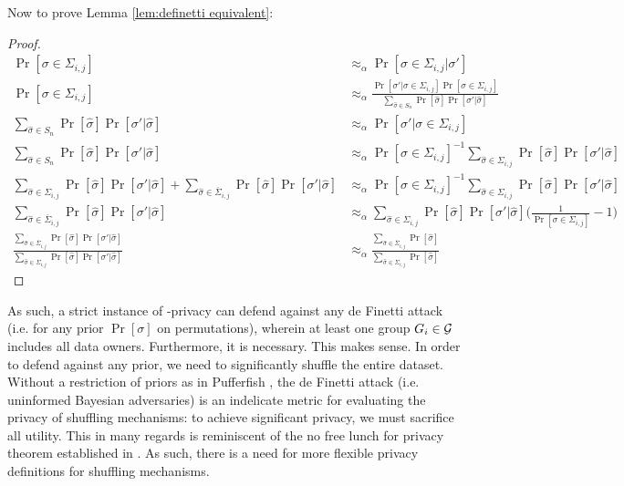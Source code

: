 Now to prove Lemma \ref{lem:definetti equivalent}: 
\begin{proof}
\begin{align*}
    \Pr[\sigma \in \Sigma_{i,j} ] 
    &\approx_\alpha \Pr[\sigma \in \Sigma_{i,j} | \sigma'] \\
    \Pr[\sigma \in \Sigma_{i,j} ]
    &\approx_\alpha \frac{\Pr[\sigma' | \sigma \in \Sigma_{i,j}] \Pr[\sigma \in \Sigma_{i,j} ]}{\sum_{\hat{\sigma} \in S_n} \Pr[\hat{\sigma}] \Pr[\sigma' | \hat{\sigma}]} \\
    \sum_{\hat{\sigma} \in S_n} \Pr[\hat{\sigma}] \Pr[\sigma' | \hat{\sigma}] 
    &\approx_\alpha \Pr[\sigma' | \sigma \in \Sigma_{i,j}] \\
    \sum_{\hat{\sigma} \in S_n} \Pr[\hat{\sigma}] \Pr[\sigma' | \hat{\sigma}] 
    &\approx_\alpha \Pr[\sigma \in \Sigma_{i,j}]^{-1} \sum_{\hat{\sigma} \in \Sigma_{i,j}} \Pr[\hat{\sigma}] \Pr[\sigma' | \hat{\sigma}] \\
    \sum_{\hat{\sigma} \in \Sigma_{i,j}} \Pr[\hat{\sigma}] \Pr[\sigma' | \hat{\sigma}] +
    \sum_{\hat{\sigma} \in \overline{\Sigma}_{i,j}} \Pr[\hat{\sigma}] \Pr[\sigma' | \hat{\sigma}] 
    &\approx_\alpha \Pr[\sigma \in \Sigma_{i,j}]^{-1} \sum_{\hat{\sigma} \in \Sigma_{i,j}} \Pr[\hat{\sigma}] \Pr[\sigma' | \hat{\sigma}] \\
    \sum_{\hat{\sigma} \in \overline{\Sigma}_{i,j}} \Pr[\hat{\sigma}] \Pr[\sigma' | \hat{\sigma}] 
    &\approx_\alpha \sum_{\hat{\sigma} \in \Sigma_{i,j}} \Pr[\hat{\sigma}] \Pr[\sigma' | \hat{\sigma}] 
    \Big( \frac{1}{\Pr[\sigma \in \Sigma_{i,j}]} - 1 \Big)  \\
    \frac{\sum_{\hat{\sigma} \in \overline{\Sigma}_{i,j}} \Pr[\hat{\sigma}] \Pr[\sigma' | \hat{\sigma}] }{
    \sum_{\hat{\sigma} \in {\Sigma_{i,j}}} \Pr[\hat{\sigma}] \Pr[\sigma' | \hat{\sigma}] } 
    &\approx_\alpha 
    \frac{\sum_{\hat{\sigma} \in \overline{\Sigma}_{i,j}} \Pr[\hat{\sigma}] }{
    \sum_{\hat{\sigma} \in {\Sigma_{i,j}}} \Pr[\hat{\sigma}] }
\end{align*}
\end{proof}

As such, a strict instance of \name-privacy can defend against any de Finetti attack (i.e. for any prior $\Pr[\sigma]$ on permutations), wherein at least one group $G_i \in \mathcal{G}$ includes all data owners. Furthermore, it is necessary. This makes sense. In order to defend against any prior, we need to significantly shuffle the entire dataset. Without a restriction of priors as in Pufferfish \cite{Pufferfish}, the de Finetti attack (i.e. uninformed Bayesian adversaries) is an indelicate metric for evaluating the privacy of shuffling mechanisms: to achieve significant privacy, we must sacrifice all utility. This in many regards is reminiscent of the no free lunch for privacy theorem established in \cite{Kifer}. As such, there is a need for more flexible privacy definitions for shuffling mechanisms.  

